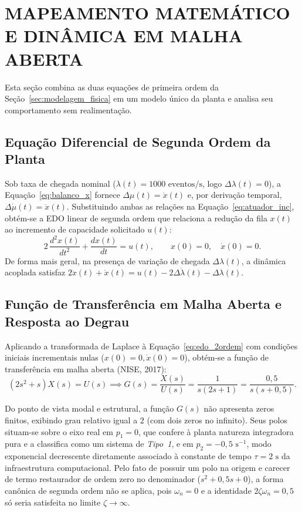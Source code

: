 \section{MAPEAMENTO MATEMÁTICO E DINÂMICA EM MALHA ABERTA}\label{sec:malha_aberta}

Esta seção combina as duas equações de primeira ordem da Seção~\ref{sec:modelagem_fisica} em um modelo único da planta e analisa seu comportamento sem realimentação.

\subsection{Equação Diferencial de Segunda Ordem da Planta}\label{sec:edo_planta}
Sob taxa de chegada nominal ($\lambda(t) = 1000\text{ eventos/s}$, logo $\Delta\lambda(t) = 0$), a Equação~\eqref{eq:balanco_x} fornece $\Delta\mu(t) = \dot{x}(t)$ e, por derivação temporal, $\Delta\dot{\mu}(t) = \ddot{x}(t)$. Substituindo ambas as relações na Equação~\eqref{eq:atuador_inc}, obtém-se a EDO linear de segunda ordem que relaciona a redução da fila $x(t)$ ao incremento de capacidade solicitado $u(t)$:
\begin{equation}
    2\,\frac{d^2 x(t)}{dt^2} + \frac{dx(t)}{dt} = u(t), \qquad x(0) = 0,\quad \dot{x}(0) = 0.
    \label{eq:edo_2ordem}
\end{equation}
De forma mais geral, na presença de variação de chegada $\Delta\lambda(t)$, a dinâmica acoplada satisfaz $2\ddot{x}(t) + \dot{x}(t) = u(t) - 2\Delta\dot{\lambda}(t) - \Delta\lambda(t)$.

\subsection{Função de Transferência em Malha Aberta e Resposta ao Degrau}\label{sec:ft_ma}
Aplicando a transformada de Laplace à Equação~\eqref{eq:edo_2ordem} com condições iniciais incrementais nulas ($x(0)=0, \dot{x}(0)=0$), obtém-se a função de transferência em malha aberta (NISE, 2017):
\begin{equation}
    (2s^2 + s)X(s) = U(s) \implies G(s) = \frac{X(s)}{U(s)} = \frac{1}{s(2s + 1)} = \frac{0{,}5}{s(s + 0{,}5)}.
    \label{eq:ft_planta}
\end{equation}

Do ponto de vista modal e estrutural, a função $G(s)$ não apresenta zeros finitos, exibindo grau relativo igual a $2$ (com dois zeros no infinito). Seus polos situam-se sobre o eixo real em $p_1 = 0$, que confere à planta natureza integradora pura e a classifica como um sistema de \textit{Tipo~1}, e em $p_2 = -0{,}5\text{ s}^{-1}$, modo exponencial decrescente diretamente associado à constante de tempo $\tau = 2\text{ s}$ da infraestrutura computacional. Pelo fato de possuir um polo na origem e carecer de termo restaurador de ordem zero no denominador ($s^2 + 0{,}5s + 0$), a forma canônica de segunda ordem não se aplica, pois $\omega_n = 0$ e a identidade $2\zeta\omega_n = 0{,}5$ só seria satisfeita no limite $\zeta \to \infty$.

